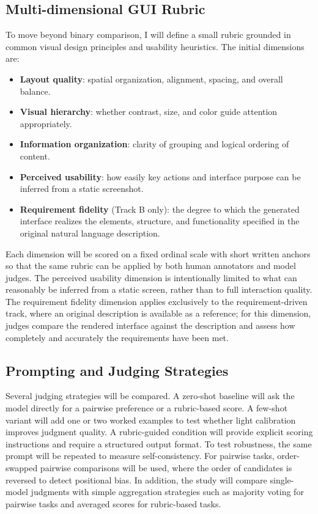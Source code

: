 \documentclass[pdflatex,sn-mathphys-num]{sn-jnl}
\begin{document}
\subsection{Multi-dimensional GUI Rubric}

To move beyond binary comparison, I will define a small rubric grounded in common
visual design principles and usability heuristics. The initial dimensions are:

\begin{itemize}
    \item \textbf{Layout quality}: spatial organization, alignment, spacing, and
    overall balance.
    \item \textbf{Visual hierarchy}: whether contrast, size, and color guide attention
    appropriately.
    \item \textbf{Information organization}: clarity of grouping and logical ordering
    of content.
    \item \textbf{Perceived usability}: how easily key actions and interface purpose
    can be inferred from a static screenshot.
    \item \textbf{Requirement fidelity} (Track B only): the degree to which the
    generated interface realizes the elements, structure, and functionality specified
    in the original natural language description.
\end{itemize}

Each dimension will be scored on a fixed ordinal scale with short written anchors so
that the same rubric can be applied by both human annotators and model judges. The
perceived usability dimension is intentionally limited to what can reasonably be
inferred from a static screen, rather than to full interaction quality. The requirement
fidelity dimension applies exclusively to the requirement-driven track, where an
original description is available as a reference; for this dimension, judges compare
the rendered interface against the description and assess how completely and accurately
the requirements have been met.

\subsection{Prompting and Judging Strategies}

Several judging strategies will be compared. A zero-shot baseline will ask the model
directly for a pairwise preference or a rubric-based score. A few-shot variant will add
one or two worked examples to test whether light calibration improves judgment quality.
A rubric-guided condition will provide explicit scoring instructions and require a
structured output format. To test robustness, the same prompt will be repeated to
measure self-consistency. For pairwise tasks, order-swapped pairwise comparisons will
be used, where the order of candidates is reversed to detect positional bias. In
addition, the study will compare single-model judgments with simple aggregation
strategies such as majority voting for pairwise tasks and averaged scores for
rubric-based tasks.
\end{document}
